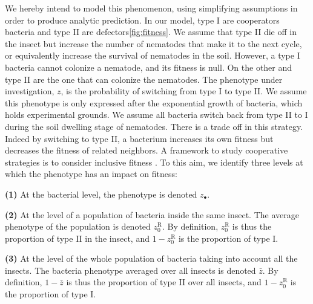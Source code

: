 \documentclass[10pt]{article}
\begin{document}
\begin{multicols}{2}
We hereby intend to model this phenomenon, using simplifying assumptions in order to produce analytic prediction.  
In our model, type I are cooperators bacteria and type II are defectors\ref{fig:fitness}. 
We assume that type II die off in the insect but increase the number of nematodes that make it to the next cycle, or equivalently increase the survival of nematodes in the soil. 
However, a type I bacteria cannot colonize a nematode, and its fitness is null. 
On the other and type II are the one that can colonize the nematodes. 
The phenotype under investigation, $z$, is the probability of switching from type I to type II. 
We assume this phenotype is only expressed after the exponential growth of bacteria, which holds experimental grounds\cite{Somvanshi2012}.  
We assume all bacteria switch back from type II to I during the soil dwelling stage of nematodes.
There is a trade off in this strategy. Indeed by switching to type II, a bacterium  increases its own fitness but decreases the fitness of related neighbors.  
A framework to study cooperative strategies is to consider inclusive fitness \cite{rousset2004genetic}.
To this aim, we identify three levels at which the phenotype has an impact on fitness:

\textbf{(1)} At the bacterial level, the phenotype is denoted $z_\bullet$.

\textbf{(2)} At the level of a population of bacteria inside the same insect. 
The average phenotype of the population is denoted $z_0^{\mathrm{R}}$. 
By definition, $z_0^{\mathrm{R}}$ is thus the proportion of type II in the insect, and $1-z_0^{\mathrm{R}}$ is the proportion of type I.

\textbf{(3)} At the level of the whole population of bacteria taking into account all the insects. The bacteria phenotype averaged over all insects is denoted $\bar{z}$. 
By definition, $1-\bar{z}$ is thus the proportion of type II over all insects, and $1-z_0^{\mathrm{R}}$ is the proportion of type I.


\end{multicols}
\end{document}
